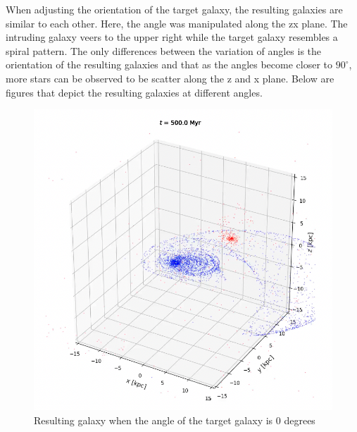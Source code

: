 \documentclass[linenumbers,RNAAS,trackchanges]{aastex631}
\begin{document}
When adjusting the orientation of the target galaxy, the resulting galaxies are similar to each other. Here, the angle was manipulated along the zx plane. The intruding galaxy veers to the upper right while the target galaxy resembles a spiral pattern. The only differences between the variation of angles is the orientation of the resulting galaxies and that as the angles become closer to $90^{\circ}$, more stars can be observed to be scatter along the z and x plane. Below are figures that depict the resulting galaxies at different angles. 

\begin{figure}[H]
    \centering
    \includegraphics[scale=.50]{vip/0ngle.png}
    \caption{Resulting galaxy when the angle of the target galaxy is 0 degrees}
    \label{fig:code}
\end{figure}
\end{document}
